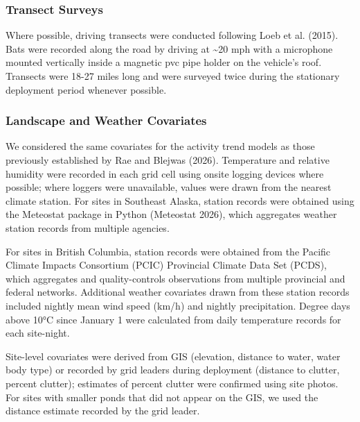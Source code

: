 \documentclass[
  letterpaper,
  DIV=11,
  numbers=noendperiod]{scrartcl}
\begin{document}
\subsubsection{Transect Surveys}\label{transect-surveys}

Where possible, driving transects were conducted following Loeb et al.
(2015). Bats were recorded along the road by driving at
\textasciitilde20 mph with a microphone mounted vertically inside a
magnetic pvc pipe holder on the vehicle's roof. Transects were 18-27
miles long and were surveyed twice during the stationary deployment
period whenever possible.

\subsubsection{Landscape and Weather
Covariates}\label{landscape-and-weather-covariates}

We considered the same covariates for the activity trend models as those
previously established by Rae and Blejwas (2026). Temperature and
relative humidity were recorded in each grid cell using onsite logging
devices where possible; where loggers were unavailable, values were
drawn from the nearest climate station. For sites in Southeast Alaska,
station records were obtained using the Meteostat package in Python
(Meteostat 2026), which aggregates weather station records from multiple
agencies.

For sites in British Columbia, station records were obtained from the
Pacific Climate Impacts Consortium (PCIC) Provincial Climate Data Set
(PCDS), which aggregates and quality-controls observations from multiple
provincial and federal networks. Additional weather covariates drawn
from these station records included nightly mean wind speed (km/h) and
nightly precipitation. Degree days above 10°C since January 1 were
calculated from daily temperature records for each site-night.

Site-level covariates were derived from GIS (elevation, distance to
water, water body type) or recorded by grid leaders during deployment
(distance to clutter, percent clutter); estimates of percent clutter
were confirmed using site photos. For sites with smaller ponds that did
not appear on the GIS, we used the distance estimate recorded by the
grid leader.
\end{document}
